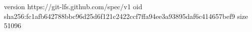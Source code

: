 version https://git-lfs.github.com/spec/v1
oid sha256:fc1afb642788bbc96d25d6f121c2422ccf7ffa94ee3a93895daf6c414657bef9
size 51096
